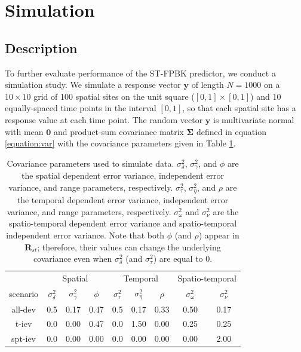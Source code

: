 \documentclass[]{article}    %
\begin{document}
\hypertarget{section:Simulation}{%
\section{Simulation}\label{section:Simulation}}

\hypertarget{description}{%
\subsection{Description}\label{description}}

To further evaluate performance of the ST-FPBK predictor, we conduct a
simulation study. We simulate a response vector \(\mathbf{y}\) of length
\(N = 1000\) on a \(10 \times 10\) grid of 100 spatial sites on the unit
square (\([0, 1] \times [0, 1]\)) and 10 equally-spaced time points in
the interval \([0, 1]\), so that each spatial site has a response value
at each time point. The random vector \(\mathbf{y}\) is multivariate
normal with mean \(\mathbf{0}\) and product-sum covariance matrix
\(\bm{\Sigma}\) defined in equation \ref{equation:var} with the
covariance parameters given in Table \ref{tab:simparmtab}.

\begin{table}[H]

\caption{\label{tab:simparmtab}Covariance parameters used to simulate data. $\sigma^2_{\delta}$, $\sigma^2_{\gamma}$, and $\phi$ are the spatial dependent error variance, independent error variance, and range parameters, respectively. $\sigma^2_{\tau}$, $\sigma^2_{\eta}$, and $\rho$ are the temporal dependent error variance, independent error variance, and range parameters, respectively. $\sigma^2_{\omega}$ and $\sigma^2_{\nu}$ are the spatio-temporal dependent error variance and spatio-temporal independent error variance. Note that both $\phi$ (and $\rho$) appear in $\mathbf{R}_{st}$; therefore, their values can change the underlying covariance even when $\sigma^2_{\delta}$ (and $\sigma^2_{\tau}$) are equal to 0.}
\centering
\begin{tabular}[t]{ccccccccc}
\toprule
\multicolumn{1}{c}{ } & \multicolumn{3}{c}{Spatial} & \multicolumn{3}{c}{Temporal} & \multicolumn{2}{c}{Spatio-temporal} \\
\cmidrule(l{3pt}r{3pt}){2-4} \cmidrule(l{3pt}r{3pt}){5-7} \cmidrule(l{3pt}r{3pt}){8-9}
scenario & $\sigma^2_{\delta}$ & $\sigma^2_{\gamma}$ & $\phi$ & $\sigma^2_{\tau}$ & $\sigma^2_{\eta}$ & $\rho$ & $\sigma^2_{\omega}$ & $\sigma^2_{\nu}$\\
\midrule
all-dev & 0.5 & 0.17 & 0.47 & 0.5 & 0.17 & 0.33 & 0.50 & 0.17\\
t-iev & 0.0 & 0.00 & 0.47 & 0.0 & 1.50 & 0.00 & 0.25 & 0.25\\
spt-iev & 0.0 & 0.00 & 0.00 & 0.0 & 0.00 & 0.00 & 0.00 & 2.00\\
\bottomrule
\end{tabular}
\end{table}
\end{document}
